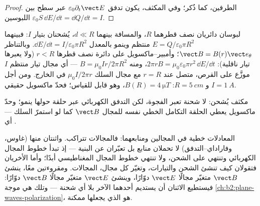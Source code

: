 \begin{proof}
 الطرفين، كما ذُكر؛ وفي المكثف، يكون تدفق
$\varepsilon_0\partial_t\vect E$ عبر سطح بين اللبوسين
$\varepsilon_0S\,\dd E/\dd t = \dd Q/\dd t = I$.
\end{proof}

\begin{example}\label{ex:b2:maxwell-equations:capacitor}
لبوسان دائريان نصف قطرهما $R$، والمسافة بينهما $d \ll R$، يُشحنان بتيار
$I$: فبينهما $E = Q/\varepsilon_0\pi R^2$ منتظم وينمو بالمعدل $\dd E/
\dd t = I/\varepsilon_0\pi R^2$. وبالتناظر $\vect B = B(r)\vect e_\theta$؛ وأمبير--ماكسويل
على دائرة نصف قطرها $r < R$ (ولا يعبرها تيار ناقلية): $2\pi rB
= \mu_0\varepsilon_0\pi r^2\,\dd E/\dd t$، ومنه $B = \mu_0Ir/2\pi R^2$ --- أي مجال
تيار منتظم $I$ موزَّع على القرص، متصل عند $r = R$ مع
مجال السلك $\mu_0I/2\pi r$ في الخارج. ومن أجل $I = \qty{1}{A}$ و $R = \qty{5}{cm}$: $B(R) =
\qty{4}{\micro T}$، وهو قابل للقياس؛ فحدّ ماكسويل حقيقي.
\end{example}

\begin{omfigure}

{\small مكثف يُشحن: لا شحنة تعبر الفجوة، لكن
التدفق الكهربائي عبر حلقة حولها ينمو؛ وحدّ ماكسويل يعطي
الحلقة التكامل الخطي نفسه للمجال $\vect B$ كما لو استمرّ السلك --- أي
.}
\end{omfigure}

\begin{remark}\label{rem:b2:maxwell-equations:linearity}
المعادلات خطية في المجالين ومنابعهما: فالمجالات
تتراكب. واثنتان منها (غاوس، وفاراداي--التدفق) لا تحملان منابع بل
تعبّران عن البنية --- إذ تبدأ خطوط المجال الكهربائي وتنتهي على الشحن،
ولا تنتهي خطوط المجال المغناطيسي أبدًا؛ وأما الأخريان فتقولان كيف تنشئ الشحن
والتيارات، وتغيّر كل مجال، المجالات. ومقروءتين
معًا، ينشئ $\vect B$ متغيّر مجالًا $\vect E$ دوّارًا، وينشئ $\vect E$
متغيّر مجالًا $\vect B$ دوّارًا: فيستطيع الاثنان أن يستديم أحدهما الآخر
بلا أي شحنة --- وتلك هي موجة
\cref{ch:b2:plane-waves-polarization}،  هو
الذي يجعلها ممكنة.
\end{remark}

